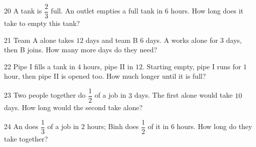 \gap
\begin{probbox}{20}{\relax}
A tank is $\dfrac23$ full. An outlet empties a full tank in $6$ hours. How long does it take to empty this tank?
\end{probbox}
\gap
\begin{probbox}{21}{\relax}
Team A alone takes $12$ days and team B $6$ days. A works alone for $3$ days, then B joins. How many more days do they need?
\end{probbox}
\gap
\begin{probbox}{22}{\relax}
Pipe I fills a tank in $4$ hours, pipe II in $12$. Starting empty, pipe I runs for $1$ hour, then pipe II is opened too. How much longer until it is full?
\end{probbox}
\gap
\begin{probbox}{23}{\relax}
Two people together do $\dfrac12$ of a job in $3$ days. The first alone would take $10$ days. How long would the second take alone?
\end{probbox}
\gap
\begin{probbox}{24}{\relax}
An does $\dfrac13$ of a job in $2$ hours; Binh does $\dfrac12$ of it in $6$ hours. How long do they take together?
\end{probbox}
